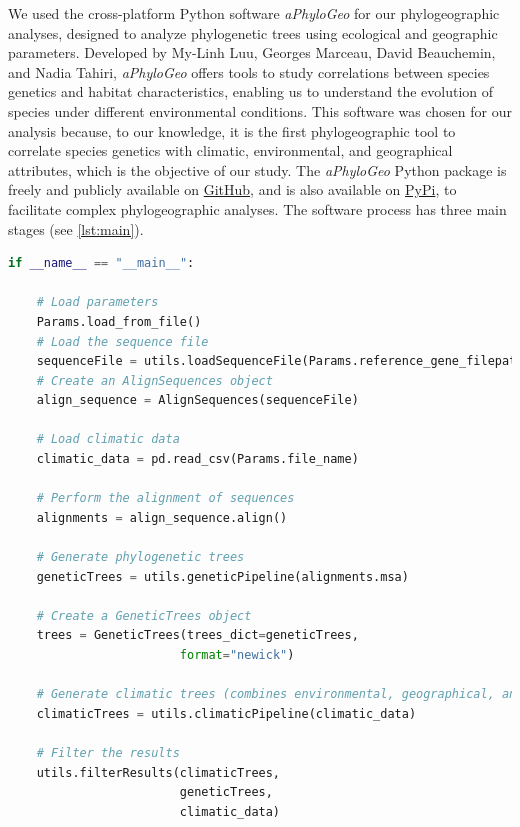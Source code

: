 We used the cross-platform Python software \textit{aPhyloGeo} for our phylogeographic analyses, designed to analyze phylogenetic trees using ecological and geographic parameters. Developed by My-Linh Luu, Georges Marceau, David Beauchemin, and Nadia Tahiri, \textit{aPhyloGeo} offers tools to study correlations between species genetics and habitat characteristics, enabling us to understand the evolution of species under different environmental conditions. This software was chosen for our analysis because, to our knowledge, it is the first phylogeographic tool to correlate species genetics with climatic, environmental, and geographical attributes, which is the objective of our study. The \textit{aPhyloGeo} Python package is freely and publicly available on \href{https://github.com/tahiri-lab/aPhyloGeo}{GitHub}, and is also available on \href{https://pypi.org/project/aphylogeo/}{PyPi}, to facilitate complex phylogeographic analyses. The software process has three main stages (see \autoref{lst:main}).

\begin{lstlisting}[label=lst:main,language=Python,caption=Main script for tutorial using the aPhyloGeo package.]
if __name__ == "__main__":

    # Load parameters
    Params.load_from_file()
    # Load the sequence file
    sequenceFile = utils.loadSequenceFile(Params.reference_gene_filepath)
    # Create an AlignSequences object
    align_sequence = AlignSequences(sequenceFile)

    # Load climatic data 
    climatic_data = pd.read_csv(Params.file_name)

    # Perform the alignment of sequences
    alignments = align_sequence.align()

    # Generate phylogenetic trees
    geneticTrees = utils.geneticPipeline(alignments.msa)
    
    # Create a GeneticTrees object
    trees = GeneticTrees(trees_dict=geneticTrees, 
                        format="newick")
   
    # Generate climatic trees (combines environmental, geographical, and climatic data)
    climaticTrees = utils.climaticPipeline(climatic_data)
    
    # Filter the results
    utils.filterResults(climaticTrees, 
                        geneticTrees, 
                        climatic_data)

\end{lstlisting}

